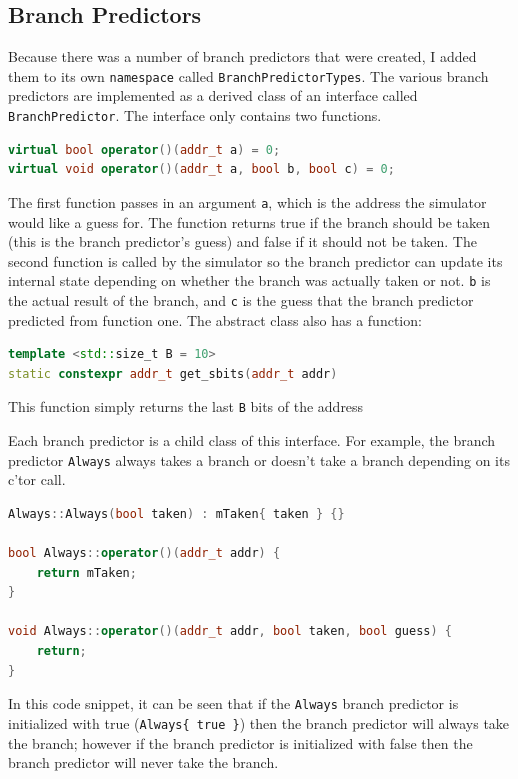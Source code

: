 \documentclass{article}
\begin{document}
        \subsection{Branch Predictors}
        Because there was a number of branch predictors that were created, I added them to its own \texttt{namespace} called \texttt{BranchPredictorTypes}. The various branch predictors are implemented as a derived class of an interface called \texttt{BranchPredictor}. The interface only contains two functions.
        \begin{lstlisting}[language=C++]
virtual bool operator()(addr_t a) = 0;
virtual void operator()(addr_t a, bool b, bool c) = 0;
        \end{lstlisting}
        The first function passes in an argument \texttt{a}, which is the address the simulator would like a guess for. The function returns true if the branch should be taken (this is the branch predictor's guess) and false if it should not be taken. The second function is called by the simulator so the branch predictor can update its internal state depending on whether the branch was actually taken or not. \texttt{b} is the actual result of the branch, and \texttt{c} is the guess that the branch predictor predicted from function one. The abstract class also has a function:
        \begin{lstlisting}[language=C++]
template <std::size_t B = 10>
static constexpr addr_t get_sbits(addr_t addr)
        \end{lstlisting}
        This function simply returns the last \texttt{B} bits of the address \par
        Each branch predictor is a child class of this interface. For example, the branch predictor \texttt{Always} always takes a branch or doesn't take a branch depending on its c'tor call.
        \begin{lstlisting}[language=C++]
Always::Always(bool taken) : mTaken{ taken } {}

bool Always::operator()(addr_t addr) {
    return mTaken;
}

void Always::operator()(addr_t addr, bool taken, bool guess) {
    return;
}
        \end{lstlisting}
        In this code snippet, it can be seen that if the \texttt{Always} branch predictor is initialized with true (\texttt{Always\{ true \}}) then the branch predictor will always take the branch; however if the branch predictor is initialized with false then the branch predictor will never take the branch. \par
\end{document}
